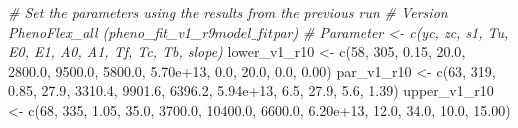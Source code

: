 \documentclass[
]{article}
\newenvironment{Shaded}{\begin{snugshade}}{\end{snugshade}}
\newcommand{\CommentTok}[1]{\textcolor[rgb]{0.56,0.35,0.01}{\textit{#1}}}
\newcommand{\DecValTok}[1]{\textcolor[rgb]{0.00,0.00,0.81}{#1}}
\newcommand{\FloatTok}[1]{\textcolor[rgb]{0.00,0.00,0.81}{#1}}
\newcommand{\FunctionTok}[1]{\textcolor[rgb]{0.00,0.00,0.00}{#1}}
\newcommand{\NormalTok}[1]{#1}
\newcommand{\OtherTok}[1]{\textcolor[rgb]{0.56,0.35,0.01}{#1}}
\begin{document}
\begin{Shaded}
\begin{Highlighting}[]
\CommentTok{\# Set the parameters using the results from the previous run}
\CommentTok{\# Version PhenoFlex\_all (pheno\_fit\_v1\_r9$model\_fit$par)}
\CommentTok{\# Parameter  \textless{}{-} c(yc,  zc,   s1,   Tu,     E0,      E1,     A0,       A1,   Tf,   Tc,   Tb, slope)}
\NormalTok{lower\_v1\_r10 }\OtherTok{\textless{}{-}} \FunctionTok{c}\NormalTok{(}\DecValTok{58}\NormalTok{, }\DecValTok{305}\NormalTok{, }\FloatTok{0.15}\NormalTok{, }\FloatTok{20.0}\NormalTok{, }\FloatTok{2800.0}\NormalTok{,  }\FloatTok{9500.0}\NormalTok{, }\FloatTok{5800.0}\NormalTok{, }\FloatTok{5.70e+13}\NormalTok{,  }\FloatTok{0.0}\NormalTok{, }\FloatTok{20.0}\NormalTok{,  }\FloatTok{0.0}\NormalTok{,  }\FloatTok{0.00}\NormalTok{)}
\NormalTok{par\_v1\_r10   }\OtherTok{\textless{}{-}} \FunctionTok{c}\NormalTok{(}\DecValTok{63}\NormalTok{, }\DecValTok{319}\NormalTok{, }\FloatTok{0.85}\NormalTok{, }\FloatTok{27.9}\NormalTok{, }\FloatTok{3310.4}\NormalTok{,  }\FloatTok{9901.6}\NormalTok{, }\FloatTok{6396.2}\NormalTok{, }\FloatTok{5.94e+13}\NormalTok{,  }\FloatTok{6.5}\NormalTok{, }\FloatTok{27.9}\NormalTok{,  }\FloatTok{5.6}\NormalTok{,  }\FloatTok{1.39}\NormalTok{)}
\NormalTok{upper\_v1\_r10 }\OtherTok{\textless{}{-}} \FunctionTok{c}\NormalTok{(}\DecValTok{68}\NormalTok{, }\DecValTok{335}\NormalTok{, }\FloatTok{1.05}\NormalTok{, }\FloatTok{35.0}\NormalTok{, }\FloatTok{3700.0}\NormalTok{, }\FloatTok{10400.0}\NormalTok{, }\FloatTok{6600.0}\NormalTok{, }\FloatTok{6.20e+13}\NormalTok{, }\FloatTok{12.0}\NormalTok{, }\FloatTok{34.0}\NormalTok{, }\FloatTok{10.0}\NormalTok{, }\FloatTok{15.00}\NormalTok{)}



\end{Highlighting}
\end{Shaded}
\end{document}
